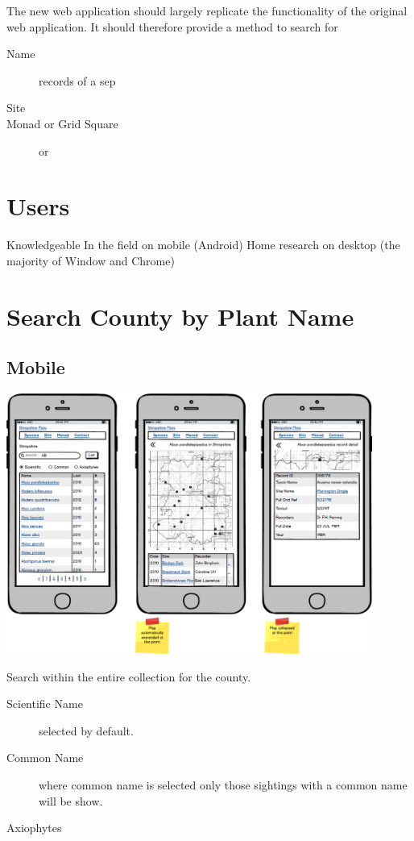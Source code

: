 \documentclass[a4paper,12pt,landscape,twocolumn]{article}
\begin{document}
The new web application should largely replicate the functionality of the original web application.
It should therefore provide a method to search for

\begin{description}
    \item[Name] records of a sep
    \item[Site]
    \item[Monad or Grid Square] or   
\end{description}

\section{Users}

Knowledgeable
In the field on mobile (Android)
Home research on desktop (the majority of Window and Chrome)


\clearpage
\section{Search County by Plant Name}
\subsection{Mobile}
\begin{multicols}{1}
    \includegraphics[width=0.9\textwidth]{./wireframes/county-mobile.png}
\end{multicols}

Search within the entire collection for the county.

\begin{description}
    \item[Scientific Name] selected by default.
    \item[Common Name] where common name is selected only those sightings with a common name will be show.
    \item[Axiophytes] 
\end{description}
\end{document}
